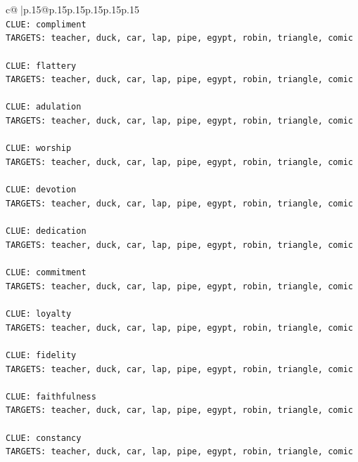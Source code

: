 \documentclass{article}
\begin{document}
{\begin{supertabular}{c@{$\;$}|p{.15\linewidth}@{}p{.15\linewidth}p{.15\linewidth}p{.15\linewidth}p{.15\linewidth}p{.15\linewidth}}
{{{\\ 
\texttt{CLUE: compliment} \\
\texttt{TARGETS: teacher, duck, car, lap, pipe, egypt, robin, triangle, comic} \\
\\ 
\texttt{CLUE: flattery} \\
\texttt{TARGETS: teacher, duck, car, lap, pipe, egypt, robin, triangle, comic} \\
\\ 
\texttt{CLUE: adulation} \\
\texttt{TARGETS: teacher, duck, car, lap, pipe, egypt, robin, triangle, comic} \\
\\ 
\texttt{CLUE: worship} \\
\texttt{TARGETS: teacher, duck, car, lap, pipe, egypt, robin, triangle, comic} \\
\\ 
\texttt{CLUE: devotion} \\
\texttt{TARGETS: teacher, duck, car, lap, pipe, egypt, robin, triangle, comic} \\
\\ 
\texttt{CLUE: dedication} \\
\texttt{TARGETS: teacher, duck, car, lap, pipe, egypt, robin, triangle, comic} \\
\\ 
\texttt{CLUE: commitment} \\
\texttt{TARGETS: teacher, duck, car, lap, pipe, egypt, robin, triangle, comic} \\
\\ 
\texttt{CLUE: loyalty} \\
\texttt{TARGETS: teacher, duck, car, lap, pipe, egypt, robin, triangle, comic} \\
\\ 
\texttt{CLUE: fidelity} \\
\texttt{TARGETS: teacher, duck, car, lap, pipe, egypt, robin, triangle, comic} \\
\\ 
\texttt{CLUE: faithfulness} \\
\texttt{TARGETS: teacher, duck, car, lap, pipe, egypt, robin, triangle, comic} \\
\\ 
\texttt{CLUE: constancy} \\
\texttt{TARGETS: teacher, duck, car, lap, pipe, egypt, robin, triangle, comic} \\
\\ 
}}}
\end{supertabular}}
\end{document}
